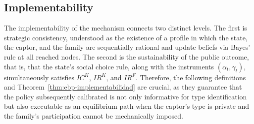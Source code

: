 \documentclass[review,authoryear,12pt]{elsarticle}
\theoremstyle{plain}
\theoremstyle{definition}
\newcommand{\1}{\mathbf{1}}
\begin{document}
\subsection{Implementability}\label{subsec:implementabilidad}

\noindent The implementability of the mechanism connects two distinct levels. The first is strategic consistency, understood as the existence of a profile in which the state, the captor, and the family are sequentially rational and update beliefs via Bayes' rule at all reached nodes. The second is the sustainability of the public outcome, that is, that the state's social choice rule, along with the instruments $(\alpha_t,\gamma_t)$, simultaneously satisfies $IC^K$, $IR^K$, and $IR^F$. Therefore, the following definitions and Theorem~\ref{thm:ebp-implementabilidad} are crucial, as they guarantee that the policy subsequently calibrated is not only informative for type identification but also executable as an equilibrium path when the captor's type is private and the family's participation cannot be mechanically imposed.
\end{document}
